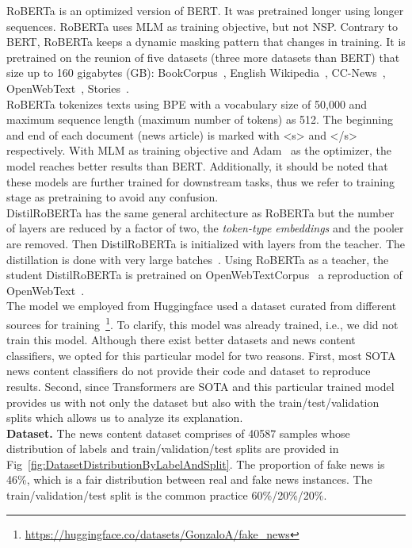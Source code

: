 RoBERTa is an optimized version of BERT. It was pretrained longer using longer sequences. RoBERTa uses MLM as training objective, but not NSP. Contrary to BERT, RoBERTa keeps a dynamic masking pattern that changes in training. It is
pretrained on the reunion of five datasets (three more datasets than BERT) that size up to 160 gigabytes (GB): BookCorpus~\parencite{BookCorpus_Yukun},
English Wikipedia~\parencite{EnglishWikipedia_Wiki},
CC-News~\parencite{CCNews_Nagel}, OpenWebText~\parencite{OpenWebText_Radford},
Stories~\parencite{ASimpleMethodForCommonsenseReasoning_Trinh}.\\
RoBERTa tokenizes texts using BPE with a vocabulary size of 50,000 and maximum sequence length (maximum number of tokens) as 512. The beginning and end of each document (news article) is marked with <s> and </s> respectively. With MLM as training objective and Adam~\parencite*{Adam_Kingma} as the optimizer, the model reaches better results than BERT. Additionally, it should be noted that these models are further trained for downstream tasks, thus we refer to training stage as pretraining to avoid any confusion.\\
DistilRoBERTa has the same general architecture as RoBERTa but the number of layers are reduced by a factor of two, the
\emph{token-type embeddings} and the pooler are removed. Then DistilRoBERTa is initialized with layers from the teacher.
The distillation is done with very large batches~\parencite{DistilBERT_Sanh}. Using RoBERTa as a teacher, the student DistilRoBERTa is pretrained on OpenWebTextCorpus~\parencite{OpenWebTextCorpus_Gokaslan} a reproduction of OpenWebText~\parencite{OpenWebText_Radford}.\\
The model we employed from Huggingface used a dataset curated from different sources for training~\footnote{\url{https://huggingface.co/datasets/GonzaloA/fake_news}}. To clarify, this model was already trained, i.e., we did not train this model. Although there exist better datasets and news content classifiers, we opted for this particular model for two reasons. First, most SOTA news content classifiers do not provide their code and dataset to reproduce results. Second, since Transformers are SOTA and this particular trained model provides us with not only the dataset but also with the train/test/validation splits which allows us to analyze its explanation.\\
\textbf{Dataset.} The news content dataset comprises of 40587 samples whose distribution of labels and train/validation/test splits are provided in Fig~\ref{fig:DatasetDistributionByLabelAndSplit}. The proportion of fake news is 46\%, which is a fair distribution between real and fake news instances. The train/validation/test split is the common practice 60\%/20\%/20\%.
